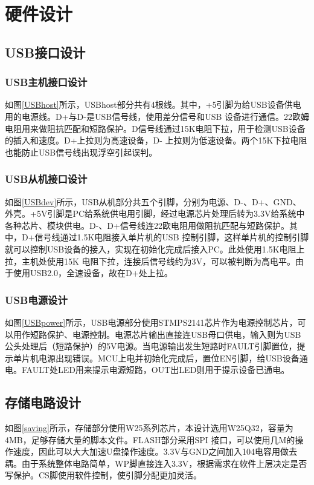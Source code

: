 
\chapter{硬件设计}
\section{USB接口设计}
\subsection{USB主机接口设计}
如图\ref{USBhost}所示，USBhost部分共有4根线。其中，+5引脚为给USB设备供电用的电源线。D+与D-是USB信号线，使用差分信号和USB 设备进行通信。22欧姆电阻用来做阻抗匹配和短路保护。D信号线通过15K电阻下拉，用于检测USB设备的插入和速度。D+上拉则为高速设备，D- 上拉则为低速设备。两个15K下拉电阻也能防止USB信号线出现浮空引起误判。
　　
\subsection{USB从机接口设计}
如图\ref{USBdev}所示，USB从机部分共五个引脚，分别为电源、D-、D+、GND、外壳。+5V引脚是PC给系统供电用引脚，经过电源芯片处理后转为3.3V给系统中各种芯片、模块供电。D-、D+信号线连22欧电阻用做阻抗匹配与短路保护。其中，D+信号线通过1.5K电阻接入单片机的USB 控制引脚，这样单片机的控制引脚就可以控制USB设备的接入，实现在初始化完成后接入PC。此处使用1.5K电阻上拉，主机处使用15K 电阻下拉，连接后信号线约为3V，可以被判断为高电平。由于使用USB2.0，全速设备，故在D+处上拉。

\subsection{USB电源设计}
如图\ref{USBpower}所示，USB电源部分使用STMPS2141芯片作为电源控制芯片，可以用作短路保护、电源控制。电源芯片输出直接连USB母口供电，输入则为USB公头处理后（短路保护）的5V电源。当电源输出发生短路时FAULT引脚置位，提示单片机电源出现错误。MCU上电并初始化完成后，置位EN引脚，给USB设备通电。FAULT处LED用来提示电源短路，OUT出LED则用于提示设备已通电。

\section{存储电路设计}
如图\ref{saving}所示，存储部分使用W25系列芯片，本设计选用W25Q32，容量为4MB，足够存储大量的脚本文件。FLASH部分采用SPI 接口，可以使用几M的操作速度，因此可以大大加速U盘操作速度。3.3V与GND之间加入104电容用做去耦。由于系统整体电路简单，WP脚直接连入3.3V，根据需求在软件上层决定是否写保护。CS脚使用软件控制，使引脚分配更加灵活。

